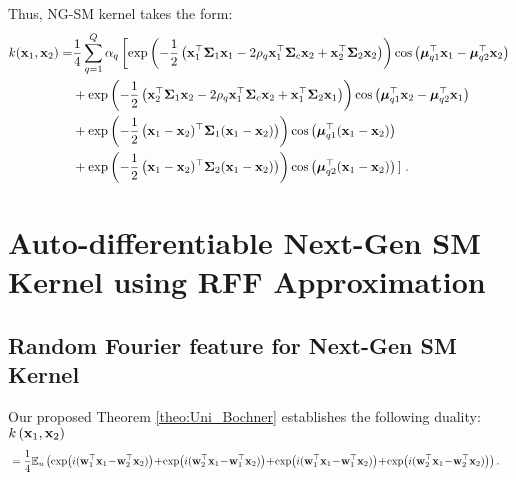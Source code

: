 Thus, NG-SM kernel takes the form:
\begin{equation}
\label{eq:ng-sm-kernel}
\begin{aligned}
k({\mathbf x}_1, {\mathbf x}_2) = &\frac{1}{4} \sum_{q = 1}^{Q} \alpha_q \left[ \exp \left(-\frac{1}{2}\left({\mathbf x}_1^\top \boldsymbol{\Sigma}_1 {\mathbf x}_1 - 2 \rho_q {\mathbf x}_1^\top  \boldsymbol{\Sigma}_c {\mathbf x}_2 + {\mathbf x}_2^\top \boldsymbol{\Sigma}_2 {\mathbf x}_2\right)\right) \cos \left(\boldsymbol{\mu}_{q1}^\top {\mathbf x}_1 - \boldsymbol{\mu}_{q2}^\top {\mathbf x}_2\right) \right.\\
&+ \exp \left(-\frac{1}{2}\left({\mathbf x}_2^\top \boldsymbol{\Sigma}_1 {\mathbf x}_2 - 2 \rho_q {\mathbf x}_1^\top  \boldsymbol{\Sigma}_c {\mathbf x}_2 + {\mathbf x}_1^\top \boldsymbol{\Sigma}_2 {\mathbf x}_1\right)\right) \cos \left(\boldsymbol{\mu}_{q1}^\top {\mathbf x}_2 - \boldsymbol{\mu}_{q2}^\top {\mathbf x}_1\right)\\ 
&+ \exp \left(-\frac{1}{2} \left( {\mathbf x}_1-{\mathbf x}_2)^\top \boldsymbol{\Sigma}_1 ({\mathbf x}_1-{\mathbf x}_2)\right) \right) \cos \left( \boldsymbol{\mu}_{q1}^\top ({\mathbf x}_1 -  {\mathbf x}_2 )\right) \\
&+  \exp \left(-\frac{1}{2} \left( {\mathbf x}_1-{\mathbf x}_2)^\top \boldsymbol{\Sigma}_2 ({\mathbf x}_1-{\mathbf x}_2)\right) \right) \cos \left( \boldsymbol{\mu}_{q2}^\top ({\mathbf x}_1 -  {\mathbf x}_2 )\right) \left] \right..
\end{aligned}
\end{equation}


\section{Auto-differentiable Next-Gen SM Kernel using RFF Approximation}
\subsection{Random Fourier feature for Next-Gen SM Kernel}
\label{app:rff_ng_sm}


Our proposed Theorem \ref{theo:Uni_Bochner} establishes the following duality: 
$k\left({\mathbf x}_1, {\mathbf x}_2\right)$
\begin{equation}
\begin{aligned}
&= \frac{1}{4} \mathbb{E}_u \left( \exp(i(\w_1^{\top} \x_1 \!-\! \w_2^{\top} \x_2)) \!+\! \exp(i(\w_2^{\top} \x_1 \!-\! \w_1^{\top} \x_2))  \!+\! \exp(i(\w_1^{\top} \x_1 \!- \!\w_1^{\top} \x_2)) \!+\! \exp(i(\w_2^{\top} \x_1 \!-\! \w_2^{\top} \x_2)) \right). \nonumber
\end{aligned}
\end{equation}

